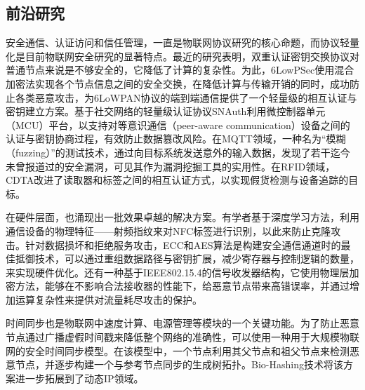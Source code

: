 \subsection{前沿研究}
\label{latest_research}
\par 安全通信、认证访问和信任管理，一直是物联网协议研究的核心命题，而协议轻量化是目前物联网安全研究的显著特点。最近的研究表明，双重认证密钥交换协议对普通节点来说是不够安全的，它降低了计算的复杂性\cite{shin2018two-factor}。为此，6LowPSec\cite{glissa20196lowpsec,qiu2016a}使用混合加密法实现各个节点信息之间的安全交换，在降低计算与传输开销的同时，成功防止各类恶意攻击，为6LoWPAN协议的端到端通信提供了一个轻量级的相互认证与密钥建立方案。基于社交网络的轻量级认证协议SNAuth\cite{dao2017achievable}利用微控制器单元（MCU）平台，以支持对等意识通信（peer-aware communication）设备之间的认证与密钥协商过程，有效防止数据篡改风险。在MQTT领域，一种名为“模糊（fuzzing）”的测试技术，通过向目标系统发送意外的输入数据，发现了若干迄今未曾报道过的安全漏洞\cite{hernandez2018mqtt}，可见其作为漏洞挖掘工具的实用性。在RFID领域，CDTA改进了读取器和标签之间的相互认证方式，以实现假货检测与设备追踪的目标\cite{yang2017a}。
\par 在硬件层面，也涌现出一批效果卓越的解决方案。有学者\cite{lee2021deep}基于深度学习方法，利用通信设备的物理特征——射频指纹来对NFC标签进行识别，以此来防止克隆攻击。针对数据损坏和拒绝服务攻击，ECC和AES算法是构建安全通信通道时的最佳抵御技术\cite{singh2018near}，可以通过重组数据路径与密钥扩展，减少寄存器与控制逻辑的数量，来实现硬件优化\cite{bui2017aes}。还有一种基于IEEE802.15.4的信号收发器结构\cite{nain2017a}，它使用物理层加密方法，能够在不影响合法接收器的性能下，给恶意节点带来高错误率，并通过增加运算复杂性来提供对流量耗尽攻击的保护。
\par 时间同步也是物联网中速度计算、电源管理等模块的一个关键功能。为了防止恶意节点通过广播虚假时间戳来降低整个网络的准确性，可以使用一种用于大规模物联网的安全时间同步模型\cite{qiu2017a}。在该模型中，一个节点利用其父节点和祖父节点来检测恶意节点，并逐步构建一个与参考节点同步的生成树拓扑。Bio-Hashing技术将该方案进一步拓展到了动态IP领域\cite{tao2018accessauth}。
